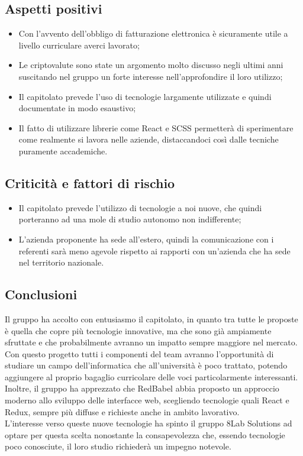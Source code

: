 \subsection{Aspetti positivi}
\begin{itemize}
	\item Con l'avvento dell'obbligo di fatturazione elettronica è sicuramente
	utile a livello curriculare averci lavorato;
	\item Le criptovalute sono state un argomento molto discusso negli ultimi anni suscitando nel gruppo un forte interesse nell'approfondire il loro utilizzo;
	\item Il capitolato prevede l'uso di tecnologie largamente utilizzate e quindi documentate in modo esaustivo;
	\item Il fatto di utilizzare librerie come React e SCSS permetterà di
	sperimentare come realmente si lavora nelle aziende, distaccandoci così dalle
	tecniche puramente accademiche.
\end{itemize}

\subsection{Criticità e fattori di rischio}
\begin{itemize}
	\item Il capitolato prevede l'utilizzo di tecnologie a noi nuove, che quindi 
porteranno ad una mole di studio autonomo non indifferente;
	\item L'azienda proponente ha sede all'estero, quindi la comunicazione con i 
referenti sarà meno agevole rispetto ai rapporti con un'azienda che ha sede nel territorio nazionale.
\end{itemize}

\subsection{Conclusioni} Il gruppo ha accolto con entusiasmo il capitolato, in 
quanto tra tutte le proposte è quella che copre più tecnologie innovative, ma 
che sono già ampiamente sfruttate e che probabilmente avranno un impatto sempre 
maggiore nel mercato. Con questo progetto tutti i componenti del team avranno l'opportunità di studiare un 
campo dell'informatica che all'università è poco trattato, potendo aggiungere al 
proprio bagaglio curricolare delle voci particolarmente interessanti. Inoltre, il 
gruppo ha apprezzato che RedBabel abbia proposto un approccio moderno allo 
sviluppo delle interfacce web, scegliendo tecnologie quali React e Redux, sempre 
più diffuse e richieste anche in ambito lavorativo.\\
 L'interesse verso queste nuove tecnologie ha spinto il gruppo 8Lab Solutions ad 
optare per questa scelta nonostante la consapevolezza che, essendo tecnologie 
poco conosciute, il loro studio richiederà un impegno notevole.
